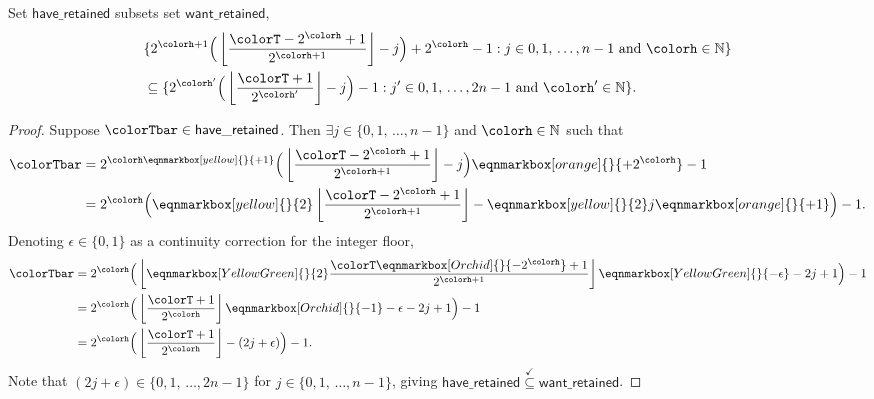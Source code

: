\begin{sublemma}
\label{thm:tilted-rsubset}
Set $\mathsf{have\_retained}$ subsets set $\mathsf{want\_retained}$,
\begin{align*}
&\{
  2^{\colorh + 1}\Big( \left\lfloor\frac{\colorT - 2^{\colorh} + 1}{2^{\colorh + 1}} \right\rfloor - j\Big) + 2^{\colorh} - 1
  :
  j \in 0,1,\,\ldots,n-1
  \text{ and }
  \colorh \in \mathbb{N}
\}\\
&\subseteq
\{
  2^{\colorh'}\Big(\left\lfloor \frac{\colorT + 1}{2^{\colorh'}} \right\rfloor - j\Big) - 1
  :
  j' \in 0,1,\,\ldots,2n-1
  \text{ and }
  \colorh' \in \mathbb{N}
\}.
\end{align*}
\end{sublemma}
\begin{proof}
Suppose $\colorTbar \in \mathsf{have\_retained}$.
Then $\exists j \in \{0,1,\,\ldots,n-1\}$ and $\colorh \in \mathbb{N}$ such that
\begin{align*}
\colorTbar
&= 2^{\colorh \eqnmarkbox[yellow]{}{+ 1}}\Big(\left\lfloor \frac{\colorT - 2^{\colorh} + 1}{2^{\colorh + 1}} \right\rfloor - j \Big) \eqnmarkbox[orange]{}{+ 2^{\colorh}} - 1\\
&= 2^{\colorh} \Big(\eqnmarkbox[yellow]{}{2}\left\lfloor \frac{\colorT - 2^{\colorh} + 1}{2^{\colorh + 1}} \right\rfloor  - \eqnmarkbox[yellow]{}{2}j \eqnmarkbox[orange]{}{+ 1} \Big) - 1.
\end{align*}
Denoting $\epsilon \in \{0, 1\}$ as a continuity correction for the integer floor,
\begin{align*}
\colorTbar
&= 2^{\colorh} \Big( \left\lfloor \eqnmarkbox[YellowGreen]{}{2} \frac{\colorT \eqnmarkbox[Orchid]{}{- 2^{\colorh}} + 1}{2^{\colorh+1}} \right\rfloor \eqnmarkbox[YellowGreen]{}{- \epsilon}  - 2j + 1 \Big) - 1\\
&= 2^{\colorh} \Big( \left\lfloor \frac{\colorT + 1}{2^{\colorh}} \right\rfloor \eqnmarkbox[Orchid]{}{- 1} - \epsilon - 2j + 1 \Big) - 1\\
&= 2^{\colorh} \Big(\left\lfloor \frac{\colorT + 1}{2^{\colorh}}\right\rfloor - (2j + \epsilon) \Big) - 1.
\end{align*}
Note that $(2j + \epsilon) \in \{0,1,\,\ldots,2n-1\}$ for $j \in \{0,1,\,\ldots,n-1\}$, giving $\mathsf{have\_retained} \stackrel{\checkmark}{\subseteq} \mathsf{want\_retained}$.
\end{proof}

